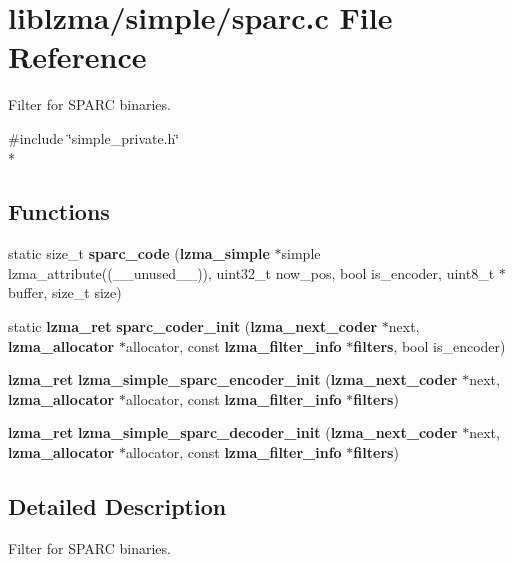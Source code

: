 \section{liblzma/simple/sparc.c File Reference}
\label{sparc_8c}


Filter for S\-P\-A\-R\-C binaries.  


{\ttfamily \#include \char`\"{}simple\-\_\-private.\-h\char`\"{}}\\*
\subsection*{Functions}
\begin{DoxyCompactItemize}
\item 
static size\-\_\-t {\bfseries sparc\-\_\-code} ({\bf lzma\-\_\-simple} $\ast$simple lzma\-\_\-attribute((\-\_\-\-\_\-unused\-\_\-\-\_\-)), uint32\-\_\-t now\-\_\-pos, bool is\-\_\-encoder, uint8\-\_\-t $\ast$buffer, size\-\_\-t size)\label{sparc_8c_a497e5cd04d2f33ab6988257aa29e111e}

\item 
static {\bf lzma\-\_\-ret} {\bfseries sparc\-\_\-coder\-\_\-init} ({\bf lzma\-\_\-next\-\_\-coder} $\ast$next, {\bf lzma\-\_\-allocator} $\ast$allocator, const {\bf lzma\-\_\-filter\-\_\-info} $\ast${\bf filters}, bool is\-\_\-encoder)\label{sparc_8c_a2a941d35dd2e6ca85ff6e5381056ec44}

\item 
{\bf lzma\-\_\-ret} {\bfseries lzma\-\_\-simple\-\_\-sparc\-\_\-encoder\-\_\-init} ({\bf lzma\-\_\-next\-\_\-coder} $\ast$next, {\bf lzma\-\_\-allocator} $\ast$allocator, const {\bf lzma\-\_\-filter\-\_\-info} $\ast${\bf filters})\label{sparc_8c_aa916dc142aba2815f843084fc2a93ebd}

\item 
{\bf lzma\-\_\-ret} {\bfseries lzma\-\_\-simple\-\_\-sparc\-\_\-decoder\-\_\-init} ({\bf lzma\-\_\-next\-\_\-coder} $\ast$next, {\bf lzma\-\_\-allocator} $\ast$allocator, const {\bf lzma\-\_\-filter\-\_\-info} $\ast${\bf filters})\label{sparc_8c_aad74d819964c254e35777fcb1da4522a}

\end{DoxyCompactItemize}


\subsection{Detailed Description}
Filter for S\-P\-A\-R\-C binaries. 